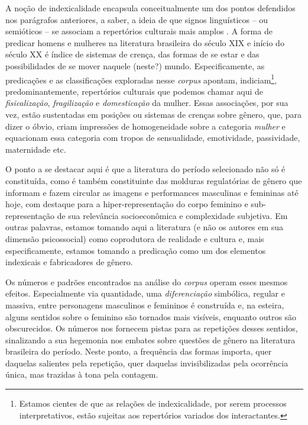\documentclass[portuguese]{textolivre}
\begin{document}
A noção de indexicalidade encapsula conceitualmente um dos pontos defendidos nos parágrafos anteriores, a saber, a ideia de que signos linguísticos – ou semióticos – se associam a repertórios culturais mais amplos \cite{silverstein1976}. A forma de predicar homens e mulheres na literatura brasileira do século XIX e início do século XX é índice de sistemas de crença, das formas de se estar e das possibilidades de se mover naquele (neste?) mundo. Especificamente, as predicações e as classificações exploradas nesse \textit{corpus} apontam, indiciam\footnote{Estamos cientes de que as relações de indexicalidade, por serem processos interpretativos, estão sujeitas aos repertórios variados dos interactantes.}, predominantemente, repertórios culturais que podemos chamar aqui de \textit{fisicalização}, \textit{fragilização} e \textit{domesticação} da mulher. Essas associações, por sua vez, estão sustentadas em posições ou sistemas de crenças sobre gênero, que, para dizer o óbvio, criam impressões de homogeneidade sobre a categoria \textit{mulher} e equacionam essa categoria com tropos de sensualidade, emotividade, passividade, maternidade etc.

O ponto a se destacar aqui é que a literatura do período selecionado não só é constituída, como é também constituinte das molduras regulatórias de gênero \cite{butler1990} que informam e fazem circular as imagens e performances masculinas e femininas até hoje, com destaque para a hiper-representação do corpo feminino e sub-representação de sua relevância socioeconômica e complexidade subjetiva. Em outras palavras, estamos tomando aqui a literatura (e não os autores em sua dimensão psicossocial) como coprodutora de realidade e cultura e, mais especificamente, estamos tomando a predicação como um dos elementos indexicais e fabricadores de gênero.

Os números e padrões encontrados na análise do \textit{corpus} operam esses mesmos efeitos. Especialmente via quantidade, uma \textit{diferenciação} \cite{thompsom1990} simbólica, regular e massiva, entre personagens masculinos e femininos é construída e, na esteira, alguns sentidos sobre o feminino são tornados mais visíveis, enquanto outros são obscurecidos. Os números nos fornecem pistas para as repetições desses sentidos, sinalizando a sua hegemonia nos embates sobre questões de gênero na literatura brasileira do período. Neste ponto, a frequência das formas importa, quer daquelas salientes pela repetição, quer daquelas invisibilizadas pela ocorrência única, mas trazidas à tona pela contagem.
\end{document}
